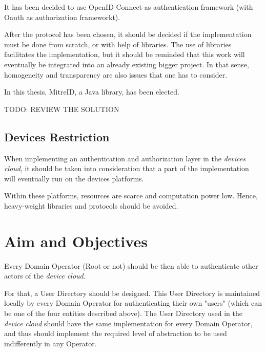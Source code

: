 It has been decided to use OpenID Connect as authentication framework (with Oauth as authorization frameworkt).

After the protocol has been chosen, it should be decided if the implementation must be done from scratch, or with help of libraries. The use of libraries facilitates the implementation, but it should be reminded that this work will eventually be integrated into an already existing bigger project. In that sense, homogeneity and transparency are also issues that one has to consider. 

In this thesis, MitreID, a Java library, has been elected.

{ \huge TODO: REVIEW THE SOLUTION }





\subsection{Devices Restriction}
When implementing an authentication and authorization layer in the \emph{devices cloud}, it should be taken into consideration that a part of the implementation will eventually run on the devices platforms. 

Within these platforms, resources are scarce and computation power low. Hence, heavy-weight libraries and protocols should be avoided.

\section{Aim and Objectives}
Every Domain Operator (Root or not) should be then able to authenticate other actors of the \emph{device cloud}.

For that, a User Directory should be designed. This User Directory is maintained locally by every Domain Operator for authenticating their own "users" (which can be one of the four entities described above). The User Directory used in the \emph{device cloud} should have the same implementation for every Domain Operator, and thus should implement the required level of abstraction to be used indifferently in any Operator.

